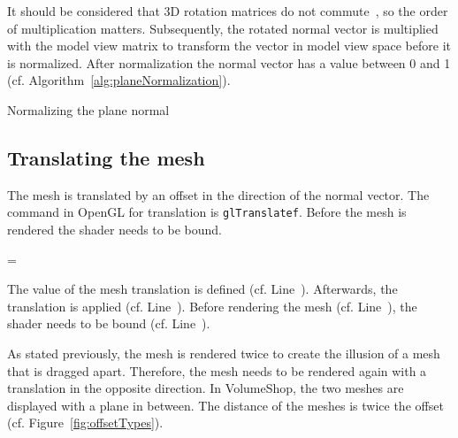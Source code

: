 It should be considered that 3D rotation matrices do not commute~\cite{book:computerGraphicsHill}, so the order of multiplication matters. Subsequently, the rotated normal vector is multiplied with the model view matrix to transform the vector in model view space before it is normalized. After normalization the normal vector has a value between 0 and 1 (cf. Algorithm~\ref{alg:planeNormalization}).
\begin{algorithm}
\;
\BlankLine
\caption{Normalizing the plane normal}
\label{alg:planeNormalization}
\end{algorithm}

\subsection{Translating the mesh}
The mesh is translated by an offset in the direction of the normal vector. The command in OpenGL for translation is \texttt{glTranslatef}. Before the mesh is rendered the shader needs to be bound.
\LinesNumbered
\begin{algorithm}
  = \;\label{ln:translationValue}
\;\label{ln:mtranslation}
\;\label{ln:bindShader}
\;\label{ln:renderMesh}
\;\label{ln:releaseMesh}
\BlankLine
\caption{The value of the mesh translation is defined (cf. Line~\NlSty{\ref{ln:translationValue}}). Afterwards, the translation is applied (cf. Line~\NlSty{\ref{ln:mtranslation}}). Before rendering the mesh (cf. Line~\NlSty{\ref{ln:renderMesh}}), the shader needs to be bound (cf. Line~\NlSty{\ref{ln:bindShader}}).}
\label{alg:shaderBinding}
\end{algorithm}
\LinesNotNumbered

As stated previously, the mesh is rendered twice to create the illusion of a mesh that is dragged apart. Therefore, the mesh needs to be rendered again with a translation in the opposite direction. In VolumeShop, the two meshes are displayed with a plane in between. The distance of the meshes is twice the offset (cf. Figure~\ref{fig:offsetTypes}).

